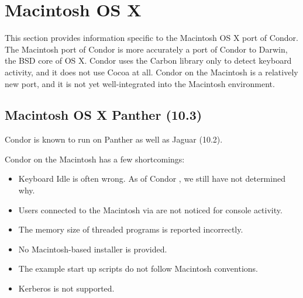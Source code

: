 \section{\label{sec:platform-linux}Macintosh OS X}

This section provides information specific to the Macintosh OS X port of
Condor.
The Macintosh port of Condor is more accurately a port of Condor to
Darwin, the BSD core of OS X. Condor uses the Carbon library only to
detect keyboard activity, and it does not use Cocoa at all.
Condor on the Macintosh is a relatively new port, and it 
is not yet well-integrated
into the Macintosh environment. 
\subsection{\label{sec:platform-macos-panther}Macintosh OS X Panther (10.3)}

Condor \VersionNotice
is known to run on Panther as well
as Jaguar (10.2). 

Condor on the Macintosh has a few shortcomings:
\begin{itemize}
\item Keyboard Idle is often wrong. As of Condor \VersionNotice, we still
have not determined why.
\item Users connected to the Macintosh via  are not
noticed for console activity.
\item The memory size of threaded programs is reported incorrectly.
\item No Macintosh-based installer is provided.
\item The example start up scripts do not follow Macintosh conventions.
\item Kerberos is not supported.
\end{itemize}

